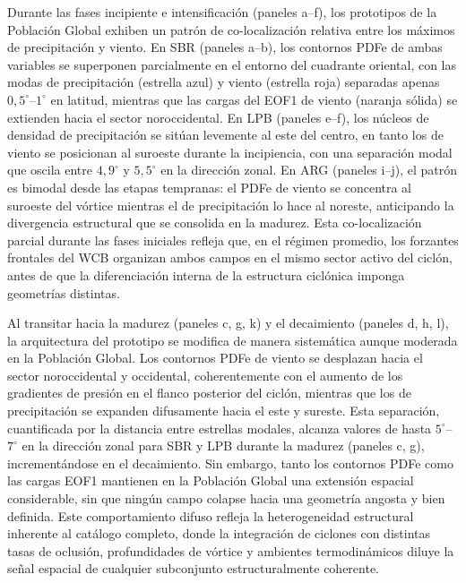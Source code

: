 Durante las fases incipiente e intensificación (paneles a--f), los prototipos de la Población Global exhiben un patrón de co-localización relativa entre los máximos de precipitación y viento. En SBR (paneles a--b), los contornos PDFe de ambas variables se superponen parcialmente en el entorno del cuadrante oriental, con las modas de precipitación (estrella azul) y viento (estrella roja) separadas apenas $0{,}5^{\circ}$--$1^{\circ}$ en latitud, mientras que las cargas del EOF1 de viento (naranja sólida) se extienden hacia el sector noroccidental. En LPB (paneles e--f), los núcleos de densidad de precipitación se sitúan levemente al este del centro, en tanto los de viento se posicionan al suroeste durante la incipiencia, con una separación modal que oscila entre $4{,}9^{\circ}$ y $5{,}5^{\circ}$ en la dirección zonal. En ARG (paneles i--j), el patrón es bimodal desde las etapas tempranas: el PDFe de viento se concentra al suroeste del vórtice mientras el de precipitación lo hace al noreste, anticipando la divergencia estructural que se consolida en la madurez. Esta co-localización parcial durante las fases iniciales refleja que, en el régimen promedio, los forzantes frontales del WCB organizan ambos campos en el mismo sector activo del ciclón, antes de que la diferenciación interna de la estructura ciclónica imponga geometrías distintas.

Al transitar hacia la madurez (paneles c, g, k) y el decaimiento (paneles d, h, l), la arquitectura del prototipo se modifica de manera sistemática aunque moderada en la Población Global. Los contornos PDFe de viento se desplazan hacia el sector noroccidental y occidental, coherentemente con el aumento de los gradientes de presión en el flanco posterior del ciclón, mientras que los de precipitación se expanden difusamente hacia el este y sureste. Esta separación, cuantificada por la distancia entre estrellas modales, alcanza valores de hasta $5^{\circ}$--$7^{\circ}$ en la dirección zonal para SBR y LPB durante la madurez (paneles c, g), incrementándose en el decaimiento. Sin embargo, tanto los contornos PDFe como las cargas EOF1 mantienen en la Población Global una extensión espacial considerable, sin que ningún campo colapse hacia una geometría angosta y bien definida. Este comportamiento difuso refleja la heterogeneidad estructural inherente al catálogo completo, donde la integración de ciclones con distintas tasas de oclusión, profundidades de vórtice y ambientes termodinámicos diluye la señal espacial de cualquier subconjunto estructuralmente coherente.

